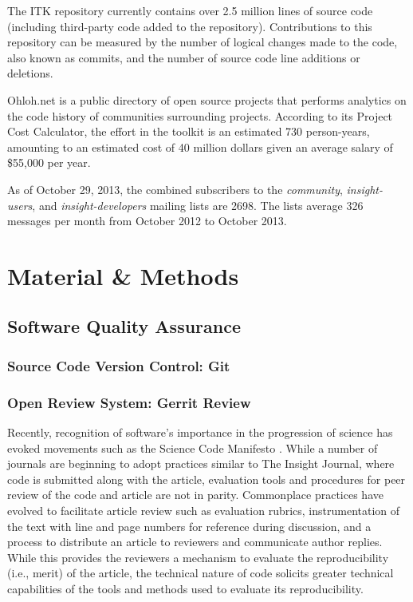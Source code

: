 \documentclass{frontiersENG} %
\begin{document}
The ITK repository currently contains over 2.5 million lines of source code (including third-party code added to the repository). Contributions to this repository can be measured by the number of logical changes made to the code, also known as commits, and the number of source code line additions or deletions.

Ohloh.net is a public directory of open source projects that performs analytics on the code history of communities surrounding projects. According to its Project Cost Calculator, the effort in the toolkit is an estimated 730 person-years, amounting to an estimated cost of 40 million dollars given an average salary of \$55,000 per year.

As of October 29, 2013, the combined subscribers to the
\textit{community}, \textit{insight-users}, and
\textit{insight-developers} mailing lists are 2698.
The lists average 326 messages per month from October 2012 to October 2013.


\section{Material \& Methods}

\subsection{Software Quality Assurance}

\subsubsection{Source Code Version Control: Git}

\subsubsection{Open Review System: Gerrit Review}
Recently, recognition of software’s importance in the progression of science has evoked movements such as the Science Code Manifesto \cite{Barnes2010}. While a number of journals are beginning to adopt practices similar to The Insight Journal, where code is submitted along with the article, evaluation tools and procedures for peer review of the code and article are not in parity.  Commonplace practices have evolved to facilitate article review such as evaluation rubrics, instrumentation of the text with line and page numbers for reference during discussion, and a process to distribute an article to reviewers and communicate author replies.  While this provides the reviewers a mechanism to evaluate the reproducibility (i.e., merit) of the article, the technical nature of code solicits greater technical capabilities of the tools and methods used to evaluate its reproducibility.
\end{document}
